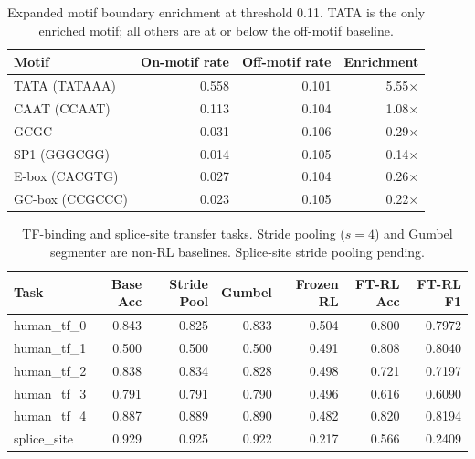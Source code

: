 \documentclass[sigconf,screen]{acmart}
\begin{document}
\begin{table}[H]
    \centering
    \caption{Expanded motif boundary enrichment at threshold 0.11. TATA is the only enriched motif; all others are at or below the off-motif baseline.}
    \label{tab:motifs_full}
    \begin{tabular}{lrrr}
        \toprule
        Motif & On-motif rate & Off-motif rate & Enrichment \\
        \midrule
        TATA (TATAAA)   & 0.558 & 0.101 & 5.55$\times$ \\
        CAAT (CCAAT)    & 0.113 & 0.104 & 1.08$\times$ \\
        GCGC            & 0.031 & 0.106 & 0.29$\times$ \\
        SP1 (GGGCGG)    & 0.014 & 0.105 & 0.14$\times$ \\
        E-box (CACGTG)  & 0.027 & 0.104 & 0.26$\times$ \\
        GC-box (CCGCCC) & 0.023 & 0.105 & 0.22$\times$ \\
        \bottomrule
    \end{tabular}
\end{table}

\begin{table}[H]
    \centering
    \caption{TF-binding and splice-site transfer tasks. Stride pooling ($s=4$) and Gumbel segmenter are non-RL baselines. Splice-site stride pooling pending.}
    \begin{tabular}{lrrrrrr}
        \toprule
        Task & Base Acc & Stride Pool & Gumbel & Frozen RL & FT-RL Acc & FT-RL F1 \\
        \midrule
        human\_tf\_0  & 0.843 & 0.825 & 0.833 & 0.504 & 0.800 & 0.7972 \\
        human\_tf\_1  & 0.500 & 0.500 & 0.500 & 0.491 & 0.808 & 0.8040 \\
        human\_tf\_2  & 0.838 & 0.834 & 0.828 & 0.498 & 0.721 & 0.7197 \\
        human\_tf\_3  & 0.791 & 0.791 & 0.790 & 0.496 & 0.616 & 0.6090 \\
        human\_tf\_4  & 0.887 & 0.889 & 0.890 & 0.482 & 0.820 & 0.8194 \\
        splice\_site  & 0.929 & 0.925 & 0.922 & 0.217 & 0.566 & 0.2409 \\
        \bottomrule
    \end{tabular}
\end{table}
\end{document}
